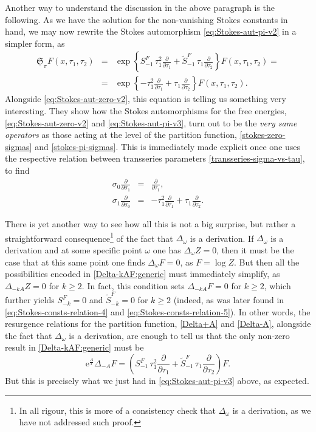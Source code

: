 \documentclass[11pt,a4paper]{article}
\newcommand{\be}{\begin{equation}}
\newcommand{\ee}{\end{equation}}
\newcommand{\bea}{\begin{eqnarray}}
\newcommand{\eea}{\end{eqnarray}}
\newcommand{\rme}{{\mathrm{e}}}
\begin{document}
Another way to understand the discussion in the above paragraph is the following. As we have the solution for the non-vanishing Stokes constants in hand, we may now rewrite the Stokes automorphism \eqref{eq:Stokes-aut-pi-v2} in a simpler form, as
%
\bea
\label{eq:Stokes-aut-pi-v3}
\underline{\mathfrak{S}}_{\pi} F (x, \tau_{1}, \tau_{2}) &=& \exp \left\{S_{-1}^{F}\, \tau_1^{2} \frac{\partial}{\partial\tau_1} + \widetilde{S}_{-1}^F\, \tau_1 \frac{\partial}{\partial\tau_2} \right\} F (x, \tau_{1}, \tau_{2}) = \\
&=& \exp \left\{ - \tau_1^{2} \frac{\partial}{\partial\tau_1} + \tau_1 \frac{\partial}{\partial\tau_2} \right\} F (x, \tau_{1}, \tau_{2}).
\eea
%
\noindent
Alongside \eqref{eq:Stokes-aut-zero-v2}, this equation is telling us something very interesting. They show how the Stokes automorphisms for the free energies, \eqref{eq:Stokes-aut-zero-v2} and \eqref{eq:Stokes-aut-pi-v3}, turn out to be the \textit{very same operators} as those acting at the level of the partition function, \eqref{stokes-zero-sigmas} and \eqref{stokes-pi-sigmas}. This is immediately made explicit once one uses the respective relation between transseries parameters \eqref{transseries-sigma-vs-tau}, to find
%
\begin{eqnarray}
\sigma_{0} \frac{\partial}{\partial\sigma_{1}} &=& \frac{\partial}{\partial\tau_1}, \\
\sigma_{1} \frac{\partial}{\partial\sigma_{0}} &=& - \tau_{1}^2 \frac{\partial}{\partial\tau_{1}} + \tau_{1} \frac{\partial}{\partial\tau_{2}}.
\end{eqnarray}

There is yet another way to see how all this is not a big surprise, but rather a straightforward consequence\footnote{In all rigour, this is more of a consistency check that $\Delta_\omega$ is a derivation, as we have not addressed such proof.} of the fact that $\Delta_\omega$ is a derivation. If $\Delta_\omega$ is a derivation and at some specific point $\omega$ one has $\Delta_\omega Z = 0$, then it must be the case that at this same point one finds $\Delta_\omega F = 0$, as $F = \log Z$. But then all the possibilities encoded in \eqref{Delta-kAF:generic} must immediately simplify, as $\Delta_{-kA} Z = 0$ for $k\ge2$. In fact, this condition sets $\Delta_{-kA} F = 0$ for $k\ge2$, which further yields $S_{-k}^{F} = 0$ and $\widetilde{S}_{-k}^{F} = 0$ for $k\ge2$ (indeed, as was later found in \eqref{eq:Stokes-consts-relation-4} and \eqref{eq:Stokes-consts-relation-5}). In other words, the resurgence relations for the partition function, \eqref{Delta+A} and \eqref{Delta-A}, alongside the fact that $\Delta_\omega$ is a derivation, are enough to tell us that the only non-zero result in \eqref{Delta-kAF:generic} must be
%
\be
\rme^{\frac{A}{x}} \Delta_{-A} F = \left( S_{-1}^{F}\, \tau_1^{2} \frac{\partial}{\partial\tau_1} + \widetilde{S}_{-1}^F\, \tau_1 \frac{\partial}{\partial\tau_2} \right) F.
\ee
%
\noindent
But this is precisely what we just had in \eqref{eq:Stokes-aut-pi-v3} above, as expected.
\end{document}
